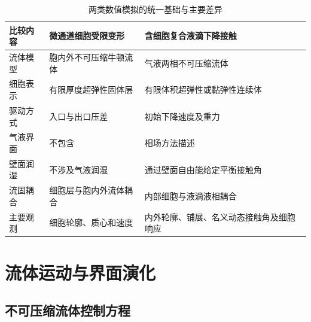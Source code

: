 \begin{table}[htbp]
\centering
\caption{两类数值模拟的统一基础与主要差异}
\label{tab:ch2_model_relation}
\renewcommand{\arraystretch}{1.18}
\begin{tabular}{p{}p{}p{}}
\toprule
比较内容 & 微通道细胞受限变形 & 含细胞复合液滴下降接触 \\
\midrule
流体模型 & 胞内外不可压缩牛顿流体 & 气液两相不可压缩流体 \\
细胞表示 & 有限厚度超弹性固体层 & 有限体积超弹性或黏弹性连续体 \\
驱动方式 & 入口与出口压差 & 初始下降速度及重力 \\
气液界面 & 不包含 & 相场方法描述 \\
壁面润湿 & 不涉及气液润湿 & 通过壁面自由能给定平衡接触角 \\
流固耦合 & 细胞层与胞内外流体耦合 & 内部细胞与液滴液相耦合 \\
主要观测 & 细胞轮廓、质心和速度 & 内外轮廓、铺展、名义动态接触角及细胞响应 \\
\bottomrule
\end{tabular}
\end{table}

\section{流体运动与界面演化}

\subsection{不可压缩流体控制方程}

